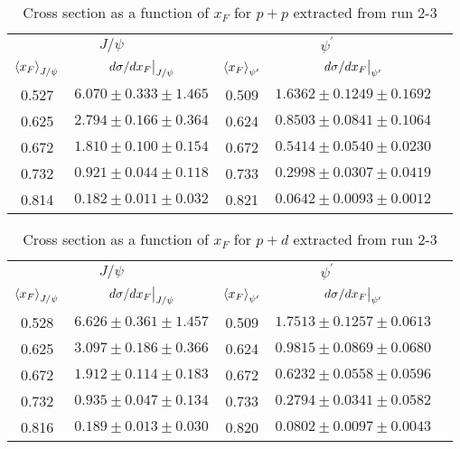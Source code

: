 \documentclass[../main.tex]{subfiles}
\begin{document}
\begin{table}[h!]
\centering
\caption{Cross section as a function of $x_F$ for $p+p$ extracted from run 2-3}
\begin{tabular}{cc|ccc}
\hline
\multicolumn{2}{c|}{$J/\psi$}                               & \multicolumn{2}{c}{$\psi^{\prime}$}                                &  \\ \cline{1-4}
$\expval{x_F}_{J/\psi}$    & $\eval{d\sigma/dx_F}_{J/\psi}$ & $\expval{x_F}_{\psi^\prime}$ & $\eval{d\sigma/dx_F}_{\psi^\prime}$ &  \\ \cline{1-4}
\multicolumn{1}{c|}{0.527} & $6.070\pm0.333\pm1.465$        & \multicolumn{1}{c|}{0.509}   & $1.6362\pm0.1249\pm0.1692$          &  \\
\multicolumn{1}{c|}{0.625} & $2.794\pm0.166\pm0.364$        & \multicolumn{1}{c|}{0.624}   & $0.8503\pm0.0841\pm0.1064$          &  \\
\multicolumn{1}{c|}{0.672} & $1.810\pm0.100\pm0.154$        & \multicolumn{1}{c|}{0.672}   & $0.5414\pm0.0540\pm0.0230$          &  \\
\multicolumn{1}{c|}{0.732} & $0.921\pm0.044\pm0.118$        & \multicolumn{1}{c|}{0.733}   & $0.2998\pm0.0307\pm0.0419$          &  \\
\multicolumn{1}{c|}{0.814} & $0.182\pm0.011\pm0.032$        & \multicolumn{1}{c|}{0.821}   & $0.0642\pm0.0093\pm0.0012$          &  \\ \cline{1-4}
\end{tabular}
\end{table}
\begin{table}[h!]
\centering
\caption{Cross section as a function of $x_F$ for $p+d$ extracted from run 2-3}
\begin{tabular}{cc|ccc}
\hline
\multicolumn{2}{c|}{$J/\psi$}                               & \multicolumn{2}{c}{$\psi^{\prime}$}                                &  \\ \cline{1-4}
$\expval{x_F}_{J/\psi}$    & $\eval{d\sigma/dx_F}_{J/\psi}$ & $\expval{x_F}_{\psi^\prime}$ & $\eval{d\sigma/dx_F}_{\psi^\prime}$ &  \\ \cline{1-4}
\multicolumn{1}{c|}{0.528} & $6.626\pm0.361\pm1.457$        & \multicolumn{1}{c|}{0.509}   & $1.7513\pm0.1257\pm0.0613$          &  \\
\multicolumn{1}{c|}{0.625} & $3.097\pm0.186\pm0.366$        & \multicolumn{1}{c|}{0.624}   & $0.9815\pm0.0869\pm0.0680$          &  \\
\multicolumn{1}{c|}{0.672} & $1.912\pm0.114\pm0.183$        & \multicolumn{1}{c|}{0.672}   & $0.6232\pm0.0558\pm0.0596$          &  \\
\multicolumn{1}{c|}{0.732} & $0.935\pm0.047\pm0.134$        & \multicolumn{1}{c|}{0.733}   & $0.2794\pm0.0341\pm0.0582$          &  \\
\multicolumn{1}{c|}{0.816} & $0.189\pm0.013\pm0.030$        & \multicolumn{1}{c|}{0.820}   & $0.0802\pm0.0097\pm0.0043$          &  \\ \cline{1-4}
\end{tabular}
\end{table}
\end{document}
